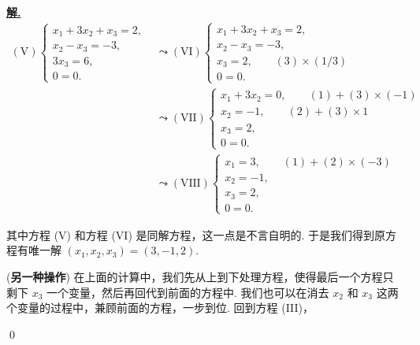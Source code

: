\documentclass[10pt,openany]{article}
\theoremstyle{thmstyle} %
\theoremstyle{defstyle} %
\theoremstyle{prostyle} %
\theoremstyle{exastyle}
\theoremstyle{remstyle}
\newenvironment{solution}{\par\underline{\textbf{解.}} \;\fangsong}{\qed\par}
\begin{document}
\begin{solution}
	 \begin{align*}
		 (\text{V}) \left\{
		\begin{array}{l}
			x_1 + 3x_2 + x_3 = 2, \\
			x_2 - x_3 = -3, \\
			3x_3 = 6, \\
			0 = 0. 
		\end{array}
		\right. &\leadsto (\text{VI}) \left\{
		\begin{array}{l}
			x_1 + 3x_2 + x_3 = 2, \\
			x_2 - x_3 = -3, \\
			x_3 = 2, \qquad (3) \times (1/3) \\
			0 = 0.
		\end{array}
		\right.\\
		&\leadsto (\text{VII}) \left\{
		\begin{array}{l}
			x_1 + 3x_2 = 0, \qquad (1)+(3) \times (-1) \\
			x_2 = -1, \qquad (2)+(3) \times 1\\
			x_3 = 2, \\
			0 = 0.
		\end{array}
		\right.\\
		&\leadsto (\text{VIII}) \left\{
		\begin{array}{l}
			x_1 = 3, \qquad (1)+(2) \times (-3) \\
			x_2 = -1, \\
			x_3 = 2, \\
			0 = 0.
		\end{array}
		\right.
	\end{align*}  
	
	其中方程 (V) 和方程 (VI) 是同解方程，这一点是不言自明的. 于是我们得到原方程有唯一解 \( (x_1,x_2,x_3)=(3,-1,2) \).
	
	(\textbf{另一种操作}) 在上面的计算中，我们先从上到下处理方程，使得最后一个方程只剩下 \( x_3 \) 一个变量，然后再回代到前面的方程中. 我们也可以在消去 \( x_2 \) 和 \( x_3 \) 这两个变量的过程中，兼顾前面的方程，一步到位. 回到方程 (III)，
	

\end{solution}
\end{document}
